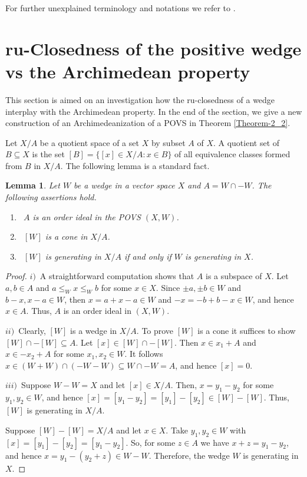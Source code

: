 \documentclass[10pt]{article}
\newtheorem{lemma}{Lemma}[section]
\begin{document}
\smallskip
For further unexplained terminology and notations we refer to \cite{AT-2007,EEG-2025,KG-2019,KM-1994}.


\section{ru-Closedness of the positive wedge vs the Archi\-medean property}

\hspace{4mm}
This section is aimed on an investigation how the ru-closedness of a wedge interplay with the Archi\-medean property.
In the end of the section, we give a new construction of an Archimedeanization of a POVS  in Theorem \ref{Theorem-2_2}.

\smallskip
Let $X/A$ be a quotient space of a set $X$ by subset $A$ of $X$. A quotient set of $B\subseteq X$ is the set $[B]=\{[x]\in X/A: x\in B\}$
of all equivalence classes formed from $B$ in $X/A$. The following lemma is a standard fact.

\begin{lemma}\label{Lemma-2_1}
Let $W$ be a wedge in a vector space $X$ and $A=W\cap -W$. The following assertions hold.
\begin{enumerate}[$i)$]
\item\
$A$ is an order ideal in the POVS $(X,W)$.
\item\
$[W]$ is a cone in $X/A$.
\item\
$[W]$ is generating in $X/A$ if and only if $W$ is generating in $X$.
\end{enumerate}
\end{lemma}

\begin{proof}
$i)$\
A straightforward computation shows that $A$ is a subspace of $X$.
Let $a,b\in A$ and $a\leqslant_W x\leqslant_W b$ for some $x\in X$. Since $\pm a,\pm b\in W$ and $b-x,x-a\in W$,
then $x=a+x-a\in W$ and $-x=-b+b-x\in W$, and hence $x\in A$. Thus, $A$ is an order ideal in $(X,W)$.

\medskip
$ii)$\
Clearly, $[W]$ is a wedge in $X/A$. To prove $[W]$ is a cone it suffices to show $[W]\cap-[W]\subseteq A$.
Let $[x]\in[W]\cap-[W]$. Then $x\in x_1+A$ and $x\in -x_2+A$ for some $x_1,x_2\in W$.
It follows $x\in(W+W)\cap(-W-W)\subseteq W\cap -W=A$, and hence $[x]=0$. 

\medskip
$iii)$\
Suppose $W-W=X$ and let $[x]\in X/A$. Then, $x=y_1-y_2$ for some $y_1,y_2\in W$, and hence
$[x]=[y_1-y_2]=[y_1]-[y_2]\in[W]-[W]$. Thus, $[W]$ is generating in $X/A$.

\smallskip
Suppose $[W]-[W]=X/A$ and let $x\in X$. Take $y_1,y_2\in W$ with $[x]=[y_1]-[y_2]=[y_1-y_2]$. 
So, for some $z\in A$ we have $x+z=y_1-y_2$, and hence $x=y_1-(y_2+z)\in W-W$. Therefore, the wedge $W$ is generating in $X$.
\end{proof}
\end{document}
